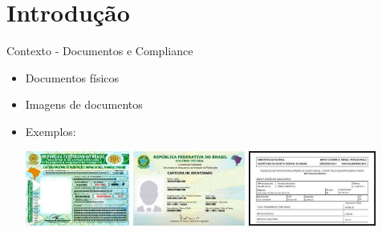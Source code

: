 \section{Introdução}

\begin{frame}{Contexto - Documentos e Compliance}
\begin{itemize}
    \item Documentos físicos
    \item Imagens de documentos
    \item Exemplos:
    \begin{center}
    \includegraphics[width=0.27\textwidth]{images-apresentacao/CNH_EXEMPLO.jpg}
    \includegraphics[width=0.29\textwidth]{images-apresentacao/CIN_EXEMPLO.jpg}
    \includegraphics[width=0.33\textwidth]{images-apresentacao/IRPF_EXEMPLO.jpg}
\end{center}
\end{itemize}
\end{frame}


